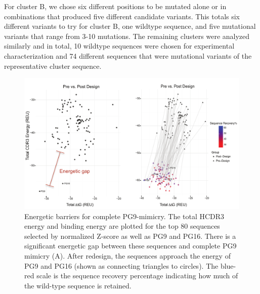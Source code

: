 For cluster B, we chose six different positions to be mutated alone or in combinations that produced five different candidate variants. This totals six different variants to try for cluster B, one wildtype sequence, and five mutational variants that range from 3-10 mutations. The remaining clusters were analyzed similarly and in total, 10 wildtype sequences were chosen for experimental characterization and 74 different sequences that were mutational variants of the representative cluster sequence.


\begin{figure}
   \centering
   \includegraphics[width=.9\linewidth]{images/chapter3/figure3_13.pdf} %
   \caption[Energetic Barriers for Complete PG9-Mimicry]{Energetic barriers for complete PG9-mimicry. The total HCDR3 energy and binding energy are plotted for the top 80 sequences selected by normalized Z-score as well as PG9 and PG16. There is a significant energetic gap between these sequences and complete PG9 mimicry (A). After redesign, the sequences approach the energy of PG9 and PG16 (shown as connecting triangles to circles). The blue-red scale is the sequence recovery percentage indicating how much of the wild-type sequence is retained.}
   \label{fig:figure3_13}
\end{figure}
